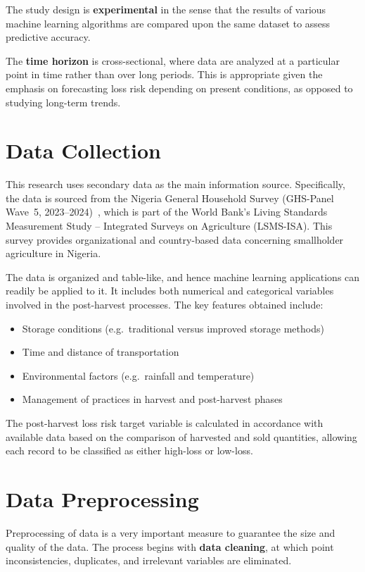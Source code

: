 The study design is \textbf{experimental} in the sense that the results of various machine learning
algorithms are compared upon the same dataset to assess predictive accuracy.

The \textbf{time horizon} is cross-sectional, where data are analyzed at a particular point in
time rather than over long periods. This is appropriate given the emphasis on forecasting loss risk
depending on present conditions, as opposed to studying long-term trends.


\section{Data Collection}

This research uses secondary data as the main information source. Specifically, the data is
sourced from the Nigeria General Household Survey (GHS-Panel Wave~5, 2023--2024)~\cite{ghspanel2024nigeria},
which is part of the World Bank's Living Standards Measurement Study -- Integrated Surveys on
Agriculture (LSMS-ISA). This survey provides organizational and country-based data concerning
smallholder agriculture in Nigeria.

The data is organized and table-like, and hence machine learning applications can readily be
applied to it. It includes both numerical and categorical variables involved in the post-harvest
processes. The key features obtained include:

\begin{itemize}
    \item Storage conditions (e.g.\ traditional versus improved storage methods)
    \item Time and distance of transportation
    \item Environmental factors (e.g.\ rainfall and temperature)
    \item Management of practices in harvest and post-harvest phases
\end{itemize}

The post-harvest loss risk target variable is calculated in accordance with available data based on
the comparison of harvested and sold quantities, allowing each record to be classified as either
high-loss or low-loss.


\section{Data Preprocessing}

Preprocessing of data is a very important measure to guarantee the size and quality of the data.
The process begins with \textbf{data cleaning}, at which point inconsistencies, duplicates, and
irrelevant variables are eliminated.

